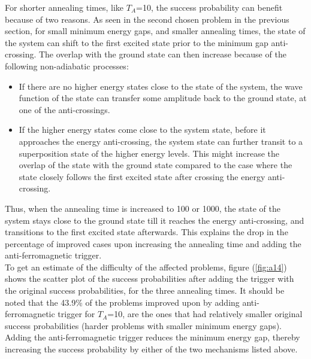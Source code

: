 \documentclass[12]{article}
\begin{document}
For shorter annealing times, like $T_A$=10, the success probability can benefit because of two reasons. As seen in the second chosen problem in the previous section, for small minimum energy gaps, and smaller annealing times, the state of the system can shift to the first excited state prior to the minimum gap anti-crossing. The overlap with the ground state can then increase because of the following non-adiabatic processes:
\begin{itemize}
\item If there are no higher energy states close to the state of the system, the wave function of the state can transfer some amplitude back to the ground state, at one of the anti-crossings.
\item If the higher energy states come close to the system state, before it approaches the energy anti-crossing, the system state can further transit to a superposition state of the higher energy levels. This might increase the overlap of the state with the ground state compared to the case where the state closely follows the first excited state after crossing the energy anti-crossing.
\end{itemize}

Thus, when the annealing time is increased to 100 or 1000, the state of the system stays close to the ground state till it reaches the energy anti-crossing, and transitions to the first excited state afterwards. This explains the drop in the percentage of improved cases upon increasing the annealing time and adding the anti-ferromagnetic trigger. \\

To get an estimate of the difficulty of the affected problems, figure (\ref{fig:a14}) shows the scatter plot of the success probabilities after adding the trigger with the original success probabilities, for the three annealing times. It should be noted that the 43.9\% of the problems improved upon by adding anti-ferromagnetic trigger for $T_A$=10, are the ones that had relatively smaller original success probabilities (harder problems with smaller minimum energy gaps). Adding the anti-ferromagnetic trigger reduces the minimum energy gap, thereby increasing the success probability by either of the two mechanisms listed above.
\end{document}
